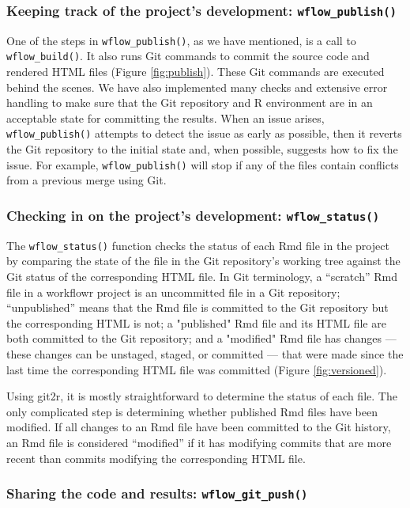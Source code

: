 \documentclass[9pt,a4paper]{extarticle}
\begin{document}
\subsubsection*{Keeping track of the project's development: \texttt{wflow\_publish()}}

One of the steps in \texttt{wflow\_publish()}, as we have mentioned, is a call to
\texttt{wflow\_build()}. It also runs Git commands to commit the source code and
rendered HTML files (Figure \ref{fig:publish}). These Git commands are executed behind
the scenes. We have also implemented many checks and extensive error
handling to make sure that the Git repository and R environment are in
an acceptable state for committing the results. When an issue arises,
\texttt{wflow\_publish()} attempts to detect the issue as early as possible, then
it reverts the Git repository to the initial state and, when possible,
suggests how to fix the issue. For example, \texttt{wflow\_publish()} will stop if
any of the files contain conflicts from a previous merge using Git.

\subsubsection*{Checking in on the project's development: \texttt{wflow\_status()}}

The \texttt{wflow\_status()} function checks the status of each Rmd file in the
project by comparing the state of the file in the Git repository's
working tree against the Git status of the corresponding HTML file. In
Git terminology, a “scratch” Rmd file in a workflowr project is an
uncommitted file in a Git repository; “unpublished” means that the Rmd
file is committed to the Git repository but the corresponding HTML is
not; a "published" Rmd file and its HTML file are both committed to the
Git repository; and a "modified" Rmd file has changes --- these changes
can be unstaged, staged, or committed --- that were made since the last
time the corresponding HTML file was committed (Figure \ref{fig:versioned}).

Using git2r, it is mostly straightforward to determine the status of
each file. The only complicated step is determining whether published
Rmd files have been modified. If all changes to an Rmd file have been
committed to the Git history, an Rmd file is considered “modified” if it
has modifying commits that are more recent than commits modifying the
corresponding HTML file.

\subsubsection*{Sharing the code and results: \texttt{wflow\_git\_push()}}
\end{document}
